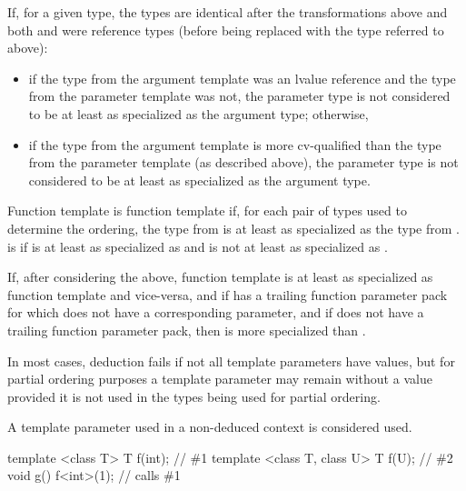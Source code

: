 \pnum
If, for a given type, the
types are identical after the transformations above
and both  and  were reference types (before being replaced with the
type referred to above):
\begin{itemize}
\item if the type from the argument template was an lvalue reference and the type
from the parameter template was not,
the parameter type is not considered to be
at least as specialized as the argument type; otherwise,
\item if the type from
the argument template is more cv-qualified than the type from the
parameter template (as described above),
the parameter type is not considered to be
at least as specialized as the argument type.
\end{itemize}

\pnum
{}%
Function template 
is 
function template  if,
for each pair of types used to determine the ordering,
the type from 
is at least as specialized as
the type from .
is 
 if
is at least as specialized as
 and
is not at least as specialized as
.

\pnum
If, after considering the above, function template 
is at least as specialized as function template  and vice-versa, and
if  has a trailing function parameter pack
for which  does not have a corresponding parameter, and
if  does not have a trailing function parameter pack,
then  is more specialized than .

\pnum
In most cases,
deduction fails if not all template parameters have values,
but for partial ordering purposes a template
parameter may remain without a value provided it is not used in the
types being used for partial ordering.
\begin{note}
A template parameter used in a non-deduced context is considered used.
\end{note}
\begin{example}
\begin{codeblock}
template <class T> T f(int);            // \#1
template <class T, class U> T f(U);     // \#2
void g() {
  f<int>(1);                            // calls \#1
}
\end{codeblock}
\end{example}

